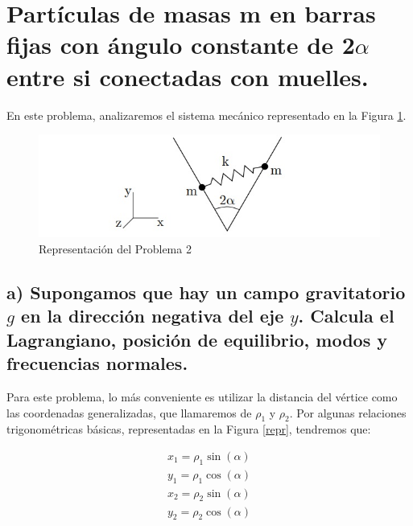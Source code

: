 \documentclass[a4paper,12pt]{article}
\begin{document}
\pagebreak

\section{ Partículas de masas m en barras fijas con ángulo constante de 2$\alpha$ entre si conectadas con muelles.}
En este problema, analizaremos el sistema mecánico representado en la Figura \ref{2nd}.
\begin{figure}
  \centering
  \caption{Representación del Problema 2}
  \label{2nd}
  \includegraphics{2.jpg}
\end{figure}

\subsection*{a) Supongamos que hay un campo gravitatorio $g$ en la dirección negativa del eje $y$. Calcula el Lagrangiano, posición de equilibrio, modos y frecuencias normales.}

Para este problema, lo más conveniente es utilizar la distancia del vértice como las coordenadas generalizadas, que llamaremos de $\rho_{1}$ y $\rho_2$. Por algunas relaciones trigonométricas básicas, representadas en la Figura \ref{repr}, tendremos que:

\begin{equation}
  \begin{aligned}
    x_1 = \rho_1 \sin{(\alpha)}\\
    y_1 = \rho_1 \cos{(\alpha)}
  \end{aligned}
\end{equation}
\begin{equation}
  \begin{aligned}
    x_2 = \rho_2 \sin{(\alpha)}\\
    y_2 = \rho_2 \cos{(\alpha)}
  \end{aligned}
\end{equation}
\end{document}
